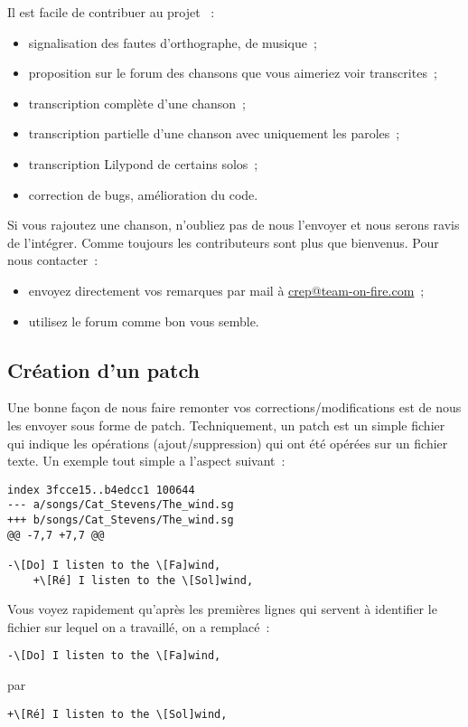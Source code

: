 \documentclass[online]{patacrep}
\begin{document}
Il est facile de contribuer au projet ~:

\begin{itemize}
\item signalisation des fautes d'orthographe, de musique~;
\item proposition sur le forum des chansons que vous aimeriez voir transcrites~;
\item transcription complète d'une chanson~;
\item transcription partielle d'une chanson avec uniquement les paroles~;
\item transcription Lilypond de certains solos~;
\item correction de bugs, amélioration du code.
\end{itemize}

Si vous rajoutez une chanson, n'oubliez pas de nous l'envoyer et nous
serons ravis de l'intégrer. Comme toujours les contributeurs sont plus
que bienvenus. Pour nous contacter~:

\begin{itemize}
\item envoyez directement vos remarques par mail à
  \url{crep@team-on-fire.com}~;
\item utilisez le forum comme bon vous semble.
\end{itemize}


\subsection{Création d'un patch}

Une bonne façon de nous faire remonter vos corrections/modifications
est de nous les envoyer sous forme de patch. Techniquement, un patch
est un simple fichier qui indique les opérations (ajout/suppression)
qui ont été opérées sur un fichier texte. Un exemple tout simple a
l'aspect suivant~:

\begin{verbatim}
index 3fcce15..b4edcc1 100644
--- a/songs/Cat_Stevens/The_wind.sg
+++ b/songs/Cat_Stevens/The_wind.sg
@@ -7,7 +7,7 @@

-\[Do] I listen to the \[Fa]wind,
    +\[Ré] I listen to the \[Sol]wind,
\end{verbatim}

Vous voyez rapidement qu'après les premières lignes qui servent à
identifier le fichier sur lequel on a travaillé, on a remplacé~:
\begin{verbatim}
-\[Do] I listen to the \[Fa]wind,
\end{verbatim}
par
\begin{verbatim}
+\[Ré] I listen to the \[Sol]wind,
\end{verbatim}
\end{document}
